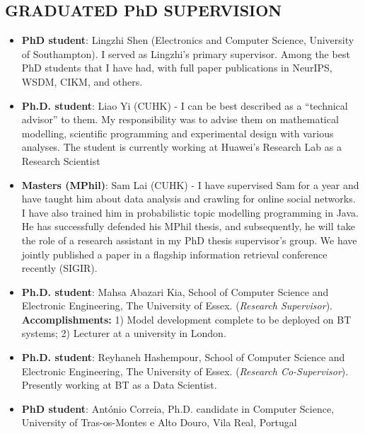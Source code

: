 \documentclass[margin]{res}
\begin{document}
\begin{resume}
\section{GRADUATED PhD SUPERVISION}
\begin{itemize}
\item \textbf{PhD student}: Lingzhi Shen (Electronics and Computer Science, University of Southampton). I served as Lingzhi's primary supervisor. Among the best PhD students that I have had, with full paper publications in NeurIPS, WSDM, CIKM, and others.
\item \textbf{Ph.D. student}: Liao Yi (CUHK) - I can be best described as a ``technical advisor'' to them. My responsibility was to advise them on mathematical modelling, scientific programming and experimental design with various analyses. The student is currently working at Huawei's Research Lab as a Research Scientist
\item \textbf{Masters (MPhil)}: Sam Lai (CUHK) - I have supervised Sam for a year and have taught him about data analysis and crawling for online social networks. I have also trained him in probabilistic topic modelling programming in Java. He has successfully defended his MPhil thesis, and subsequently, he will take the role of a research assistant in my PhD thesis supervisor's group. We have jointly published a paper in a flagship information retrieval conference recently (SIGIR).
\item \textbf{Ph.D. student}: Mahsa Abazari Kia, School of Computer Science and Electronic Engineering, The University of Essex. (\textit{Research Supervisor}). \textbf{Accomplishments:} 1) Model development complete to be deployed on BT systems; 2) Lecturer at a university in London.
\item \textbf{Ph.D. student}: Reyhaneh Hashempour, School of Computer Science and Electronic Engineering, The University of Essex. (\textit{Research Co-Supervisor}). Presently working at BT as a Data Scientist.
\item \textbf{PhD student}: Ant\'onio Correia, Ph.D. candidate in Computer Science, University of Tras-os-Montes e Alto Douro, Vila Real, Portugal

\end{itemize}
\end{resume}
\end{document}
